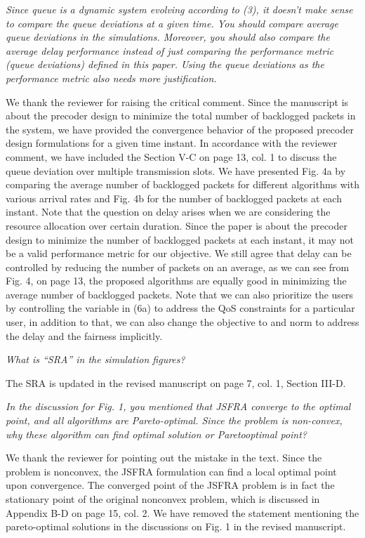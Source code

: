 \begin{itemize}
 \textit{Since queue is a dynamic system evolving according to (3), it doesn’t make sense to compare the queue deviations at a given time. You should compare average queue deviations in the simulations. Moreover, you should also compare the average delay performance instead of just comparing the performance metric (queue deviations) defined in this paper. Using the queue deviations as the performance metric also needs more justification.}

\resp We thank the reviewer for raising the critical comment. Since the manuscript is about the precoder design to minimize the total number of backlogged packets in the system, we have provided the convergence behavior of the proposed precoder design formulations for a given time instant. In accordance with the reviewer comment, we have included the Section V-C on page 13, col. 1 to discuss the queue deviation over multiple transmission slots. We have presented Fig. 4a by comparing the average number of backlogged packets for different algorithms with various arrival rates and Fig. 4b for the number of backlogged packets at each instant. Note that the question on delay arises when we are considering the resource allocation over certain duration. Since the paper is about the precoder design to minimize the number of backlogged packets at each instant, it may not be a valid performance metric for our objective. We still agree that delay can be controlled by reducing the number of packets on an average, as we can see from Fig. 4, on page 13, the proposed algorithms are equally good in minimizing the average number of backlogged packets. Note that we can also prioritize the users by controlling the variable  in (6a) to address the QoS constraints for a particular user, in addition to that, we can also change the objective to  and \me{\ell_{\infty}} norm to address the delay and the fairness implicitly. 

 \textit{What is “SRA” in the simulation figures?}

\resp The \acf{SRA} is updated in the revised manuscript on page 7, col. 1, Section III-D.

 \textit{In the discussion for Fig. 1, you mentioned that JSFRA converge to the optimal point, and all algorithms are Pareto-optimal. Since the problem is non-convex, why these algorithm can find optimal solution or Paretooptimal point?}

\resp We thank the reviewer for pointing out the mistake in the text. Since the problem is nonconvex, the JSFRA formulation can find a local optimal point upon convergence. The converged point of the JSFRA problem is in fact the stationary point of the original nonconvex problem, which is discussed in Appendix B-D on page 15, col. 2. We have removed the statement mentioning the pareto-optimal solutions in the discussions on Fig. 1 in the revised manuscript.

\end{itemize}



